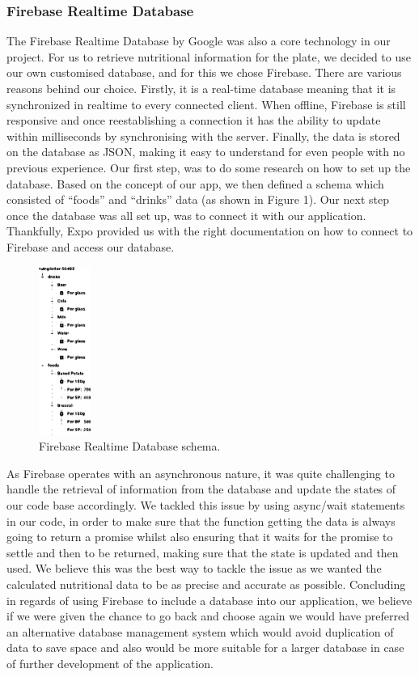 \documentclass{l3proj}
\begin{document}
\subsubsection{Firebase Realtime Database}
The Firebase Realtime Database\cite{WEBSITE:firebase} by Google was also a core technology in our project. For us to retrieve nutritional information for the plate, we decided to use our own customised database, and for this we chose Firebase. There are various reasons behind our choice. Firstly, it is a real-time database meaning that it is synchronized in realtime to every connected client. When offline, Firebase is still responsive and once reestablishing a connection it has the ability to update within milliseconds by synchronising with the server. Finally, the data is stored on the database as JSON, making it easy to understand for even people with no previous experience.
Our first step, was to do some research on how to set up the database. Based on the concept of our app, we then defined a schema which consisted of “foods” and “drinks” data (as shown in Figure 1). Our next step once the database was all set up, was to connect it with our application. Thankfully, Expo provided us with the right documentation on how to connect to Firebase and access our database. \par
\begin{figure}

  \centering
  \includegraphics[width=0.15\textwidth]{figures/firebase.eps}
  \caption{Firebase Realtime Database schema.}
  \label{fig:firebase1}
\end{figure}
As Firebase operates with an asynchronous nature, it was quite challenging to handle the retrieval of information from the database and update the states of our code base accordingly. We tackled this issue by using async/wait statements in our code, in order to make sure that the function getting the data is always going to return a promise whilst also ensuring that it waits for the promise to settle and then to be returned, making sure that the state is updated and then used. We believe this was the best way to tackle the issue as we wanted the calculated nutritional data to be as precise and accurate as possible. 
Concluding in regards of using Firebase to include a database into our application, we believe if we were given the chance to go back and choose again we would have preferred an alternative database management system which would avoid duplication of data to save space and also would be more suitable for a larger database in case of further development of the application.\par
\end{document}
